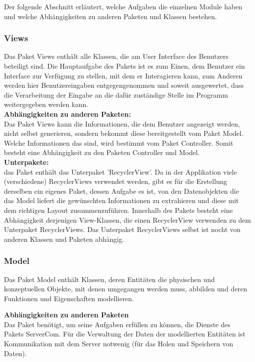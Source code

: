 \documentclass[11pt,a4paper]{report}
\begin{document}
Der folgende Abschnitt erläutert, welche Aufgaben die einzelnen Module haben und welche Abhängigkeiten zu anderen Paketen und Klassen bestehen.

\subsubsection{Views}
Das Paket Views enthält alle Klassen, die am User Interface des Benutzers beteiligt sind. Die Hauptaufgabe des Pakets ist es zum Einen, dem Benutzer ein Interface zur Verfügung zu stellen, mit dem er Interagieren kann, zum Anderen werden hier Benutzereingaben entgegengenommen und soweit ausgewertet, dass die Verarbeitung der Eingabe an die dafür zuständige Stelle im Programm weitergegeben werden kann.\\

\textbf{Abhängigkeiten zu anderen Paketen:}\\
Das Paket Views kann die Informationen, die dem Benutzer angezeigt werden, nicht selbst generieren, sondern bekommt diese bereitgestellt vom Paket Model. Welche Informationen das sind, wird bestimmt vom Paket Controller. Somit besteht eine Abhängigkeit zu den Paketen Controller und Model.\\

\textbf{Unterpakete:}\\
das Paket enthält das Unterpaket 'RecyclerView'. Da in der Applikation viele (verschiedene) RecyclerViews verwendet werden, gibt es für die Erstellung derselben ein eigenes Paket, dessen Aufgabe es ist, von den Datenobjekten die das Model liefert die gewünschten Informationen zu extrahieren und diese mit dem richtigen Layout zusammenzuführen. Innerhalb des Pakets besteht eine Abhängigkeit derjenigen View-Klassen, die einen RecyclerView verwenden zu dem Unterpaket RecyclerViews. Das Unterpaket RecyclerViews selbst ist nocht von anderen Klassen und Paketen abhängig.

\subsubsection{Model}
Das Paket Model enthält Klassen, deren Entitäten die physischen und konzeptuellen Objekte, mit denen umgegangen werden muss, abbilden und deren Funktionen und Eigenschaften modellieren.

\textbf{Abhängigkeiten zu anderen Paketen}\\
Das Paket benötigt, um seine Aufgaben erfüllen zu können, die Dienste des Pakets ServerCom. Für die Verwaltung der Daten der modellierten Entitäten ist Kommunikation mit dem Server notwenig (für das Holen und Speichern von Daten).
\end{document}
